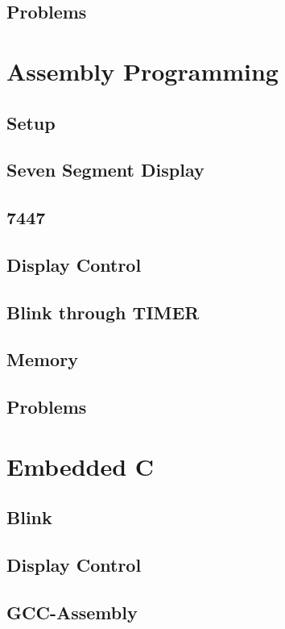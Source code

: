 \documentclass[journal]{IEEEtran}
\begin{document}
\subsection{Problems}

\newpage
\section{Assembly Programming}
\subsection{Setup}

\subsection{Seven Segment Display}

\subsection{7447}

\subsection{Display Control}

\subsection{Blink through TIMER}

\subsection{Memory}

\subsection{Problems}

\newpage
\section{Embedded C}
\subsection{Blink}

\subsection{Display Control}

\subsection{GCC-Assembly}

\end{document}
